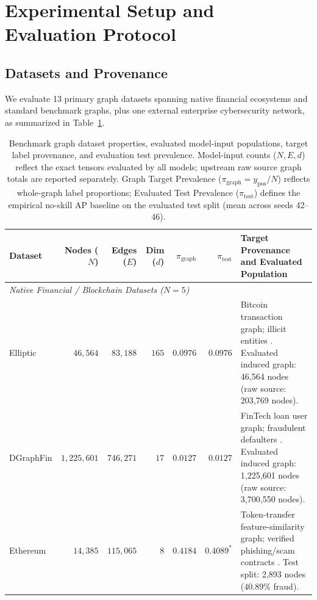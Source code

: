 \documentclass[11pt,a4paper]{article}
\begin{document}
\section{Experimental Setup and Evaluation Protocol}
\label{sec:experimental_setup}

\subsection{Datasets and Provenance}
We evaluate 13 primary graph datasets spanning native financial ecosystems and standard benchmark graphs, plus one external enterprise cybersecurity network, as summarized in Table~\ref{tab:dataset_properties}.

\begin{table}[htbp]
\centering\fontsize{7.5pt}{8.8pt}\selectfont\setlength{\tabcolsep}{2.5pt}
\caption{Benchmark graph dataset properties, evaluated model-input populations, target label provenance, and evaluation test prevalence. Model-input counts ($N, E, d$) reflect the exact tensors evaluated by all models; upstream raw source graph totals are reported separately. Graph Target Prevalence ($\pi_{\mathrm{graph}} = y_{\mathrm{pos}} / N$) reflects whole-graph label proportions; Evaluated Test Prevalence ($\pi_{\mathrm{test}}$) defines the empirical no-skill AP baseline on the evaluated test split (mean across seeds 42--46).}
\label{tab:dataset_properties}
\begin{tabularx}{\textwidth}{lrrrrr>{\raggedright\arraybackslash}X}\toprule
\textbf{Dataset} & \textbf{Nodes ($N$)} & \textbf{Edges ($E$)} & \textbf{Dim ($d$)} & $\pi_{\mathrm{graph}}$ & $\pi_{\mathrm{test}}$ & \textbf{Target Provenance and Evaluated Population} \\\midrule
\multicolumn{7}{l}{\textit{Native Financial / Blockchain Datasets ($N=5$)}} \\
Elliptic & $46,564$ & $83,188$ & $165$ & $0.0976$ & $0.0976$ & Bitcoin transaction graph; illicit entities \cite{weber2019elliptic}. Evaluated induced graph: 46,564 nodes (raw source: 203,769 nodes). \\
DGraphFin & $1,225,601$ & $746,271$ & $17$ & $0.0127$ & $0.0127$ & FinTech loan user graph; fraudulent defaulters \cite{huang2022dgraph}. Evaluated induced graph: 1,225,601 nodes (raw source: 3,700,550 nodes). \\
Ethereum & $14,385$ & $115,065$ & $8$ & $0.4184$ & $0.4089^*$ & Token-transfer feature-similarity graph; verified phishing/scam contracts \cite{luo2024multichain}. Test split: 2,893 nodes ($40.89\%$ fraud). \\

\end{tabularx}
\end{table}
\end{document}
